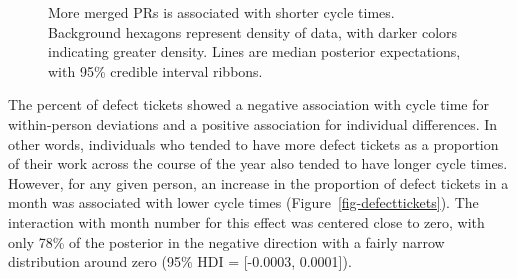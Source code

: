 \documentclass[
]{article}
\begin{document}
\begin{figure}[htbp]


\caption[More merged PRs is associated with shorter cycle
times]{\label{fig-mergedprs}More merged PRs is associated with shorter
cycle times. Background hexagons represent density of data, with darker
colors indicating greater density. Lines are median posterior
expectations, with 95\% credible interval ribbons.}

\end{figure}%

The percent of defect tickets showed a negative association with cycle
time for within-person deviations and a positive association for
individual differences. In other words, individuals who tended to have
more defect tickets as a proportion of their work across the course of
the year also tended to have longer cycle times. However, for any given
person, an increase in the proportion of defect tickets in a month was
associated with lower cycle times (Figure~\ref{fig-defecttickets}). The
interaction with month number for this effect was centered close to
zero, with only 78\% of the posterior in the negative direction with a
fairly narrow distribution around zero (95\% HDI = {[}-0.0003,
0.0001{]}).
\end{document}
